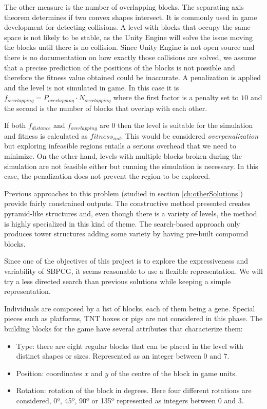 The other measure is the number of overlapping blocks. The separating axis theorem\cite{ericson2004real} determines if two convex shapes intersect. It is commonly used in game development for detecting collisions. A level with blocks that occupy the same space is not likely to be stable, as the Unity Engine will solve the issue moving the blocks until there is no collision. Since Unity Engine is not open source and there is no documentation on how exactly those collisions are solved, we assume that a precise prediction of the positions of the blocks is not possible and therefore the fitness value obtained could be inaccurate. A penalization is applied and the level is not simulated in game. In this case it is $f_{overlapping} = P_{overlapping} \cdot N_{overlapping}$ where the first factor is a penalty set to $10$ and the second is the number of blocks that overlap with each other. 

If both $f_{distance}$ and $f_{overlapping}$ are $0$ then the level is suitable for the simulation and fitness is calculated as $fitness_{ind}$. This would be considered \textit{overpenalization} but exploring infeasible regions entails a serious overhead that we need to minimize. On the other hand, levels with multiple blocks broken during the simulation are not feasible either but running the simulation is necessary. In this case, the penalization does not prevent the region to be explored.

Previous approaches to this problem (studied in section \ref{ch:otherSolutions}) provide fairly constrained outputs. The constructive method presented creates pyramid-like structures and, even though there is a variety of levels, the method is highly specialized in this kind of theme. The search-based approach only produces tower structures adding some variety by having pre-built compound blocks.

Since one of the objectives of this project is to explore the expressiveness and variability of SBPCG, it seems reasonable to use a flexible representation. We will try a less directed search than previous solutions while keeping a simple representation. 

Individuals are composed by a list of blocks, each of them being a gene. Special pieces such as platforms, TNT boxes or pigs are not considered in this phase. The building blocks for the game have several attributes that characterize them: 

\begin{itemize}
	\item Type: there are eight regular blocks that can be placed in the level with distinct shapes or sizes. Represented as an integer between $0$ and $7$.
	\item Position: coordinates $x$ and $y$ of the centre of the block in game units.
	\item Rotation: rotation of the block in degrees. Here four different rotations are considered, 0º, 45º, 90º or 135º represented as integers between $0$ and $3$.
\end{itemize}


